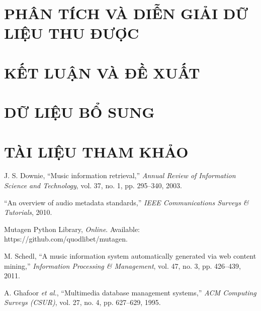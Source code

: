 \documentclass[conference]{IEEEtran}
\begin{document}
\section{PHÂN TÍCH VÀ DIỄN GIẢI DỮ LIỆU THU ĐƯỢC}


\section{KẾT LUẬN VÀ ĐỀ XUẤT}

\section{DỮ LIỆU BỔ SUNG}

\section{TÀI LIỆU THAM KHẢO}
\begin{thebibliography}{1}

J. S. Downie, ``Music information retrieval,'' \textit{Annual Review of Information Science and Technology}, vol. 37, no. 1, pp. 295--340, 2003.

``An overview of audio metadata standards,'' \textit{IEEE Communications Surveys \& Tutorials}, 2010.

Mutagen Python Library, \textit{Online}. Available: https://github.com/quodlibet/mutagen.

M. Schedl, ``A music information system automatically generated via web content mining,'' \textit{Information Processing \& Management}, vol. 47, no. 3, pp. 426--439, 2011.

A. Ghafoor \textit{et al.}, ``Multimedia database management systems,'' \textit{ACM Computing Surveys (CSUR)}, vol. 27, no. 4, pp. 627--629, 1995.

\end{thebibliography}
\end{document}
